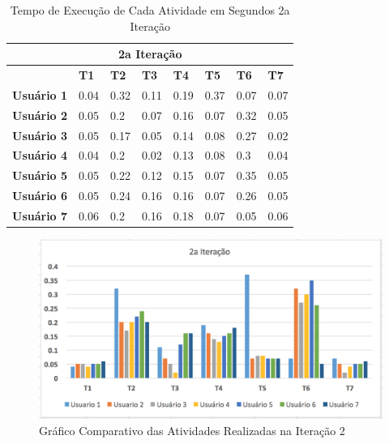 \begin{table}[h!]
\centering
\caption{Tempo de Execução de Cada Atividade em Segundos 2a Iteração}
\label{tabela_iteracao2}
\begin{tabular}{|llllllll|}
\hline
\multicolumn{8}{|c|}{\cellcolor[HTML]{C0C0C0}\textbf{2a Iteração}}                                                   \\ \hline
                   & \textbf{T1} & \textbf{T2} & \textbf{T3} & \textbf{T4} & \textbf{T5} & \textbf{T6} & \textbf{T7} \\ \hline
\textbf{Usuário 1} & 0.04        & 0.32        & 0.11        & 0.19        & 0.37        & 0.07        & 0.07        \\ \hline
\textbf{Usuário 2} & 0.05        & 0.2         & 0.07        & 0.16        & 0.07        & 0.32        & 0.05        \\ \hline
\textbf{Usuário 3} & 0.05        & 0.17        & 0.05        & 0.14        & 0.08        & 0.27        & 0.02        \\ \hline
\textbf{Usuário 4} & 0.04        & 0.2         & 0.02        & 0.13        & 0.08        & 0.3         & 0.04        \\ \hline
\textbf{Usuário 5} & 0.05        & 0.22        & 0.12        & 0.15        & 0.07        & 0.35        & 0.05        \\ \hline
\textbf{Usuário 6} & 0.05        & 0.24        & 0.16        & 0.16        & 0.07        & 0.26        & 0.05        \\ \hline
\textbf{Usuário 7} & 0.06        & 0.2         & 0.16        & 0.18        & 0.07        & 0.05        & 0.06        \\ \hline
\end{tabular}
\end{table}

\graphicspath{{figuras/}}
\begin{figure}[h!]
\centering
\includegraphics[scale=0.75]{grafico_2a_iteracao}
\caption{Gráfico Comparativo das Atividades Realizadas na Iteração 2}
\label{img:grafico_iteracao2}
\end{figure}

